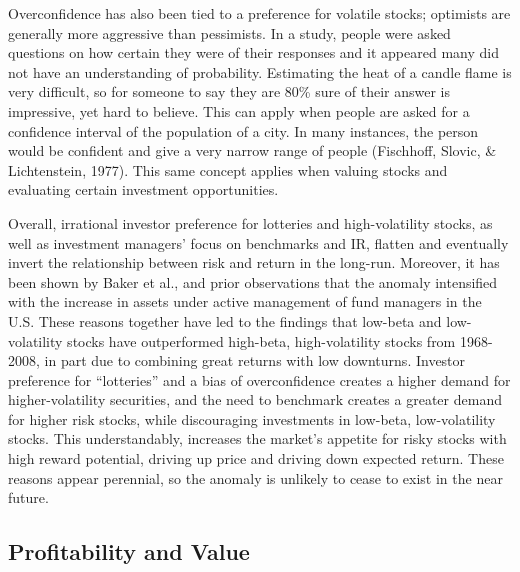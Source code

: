\documentclass[12pt,twoside]{reedthesis}
\theoremstyle{definition}
\theoremstyle{definition}
\theoremstyle{definition}
\theoremstyle{remark}
\begin{document}
Overconfidence has also been tied to a preference for volatile stocks;
optimists are generally more aggressive than pessimists. In a study,
people were asked questions on how certain they were of their responses
and it appeared many did not have an understanding of probability.
Estimating the heat of a candle flame is very difficult, so for someone
to say they are 80\% sure of their answer is impressive, yet hard to
believe. This can apply when people are asked for a confidence interval
of the population of a city. In many instances, the person would be
confident and give a very narrow range of people (Fischhoff, Slovic, \&
Lichtenstein, 1977). This same concept applies when valuing stocks and
evaluating certain investment opportunities.

Overall, irrational investor preference for lotteries and
high-volatility stocks, as well as investment managers' focus on
benchmarks and IR, flatten and eventually invert the relationship
between risk and return in the long-run. Moreover, it has been shown by
Baker et al., and prior observations that the anomaly intensified with
the increase in assets under active management of fund managers in the
U.S. These reasons together have led to the findings that low-beta and
low-volatility stocks have outperformed high-beta, high-volatility
stocks from 1968-2008, in part due to combining great returns with low
downturns. Investor preference for ``lotteries'' and a bias of
overconfidence creates a higher demand for higher-volatility securities,
and the need to benchmark creates a greater demand for higher risk
stocks, while discouraging investments in low-beta, low-volatility
stocks. This understandably, increases the market's appetite for risky
stocks with high reward potential, driving up price and driving down
expected return. These reasons appear perennial, so the anomaly is
unlikely to cease to exist in the near future.

\subsection{Profitability and Value}\label{profitability-and-value}
\end{document}
